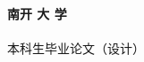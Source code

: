 \documentclass[a4paper, 12pt]{article}
\begin{document}
\begin{center}
	{
		\noindent\fontsize{35}{53}\textbf{南\quad 开 \quad 大 \quad 学} \\
		\noindent\fontsize{9}{13.5} \quad \\
		\fontsize{22}{33} 本\quad 科\quad 生\quad 毕\quad 业\quad 论\quad 文（设\quad 计）
	}
\end{center}
\end{document}
